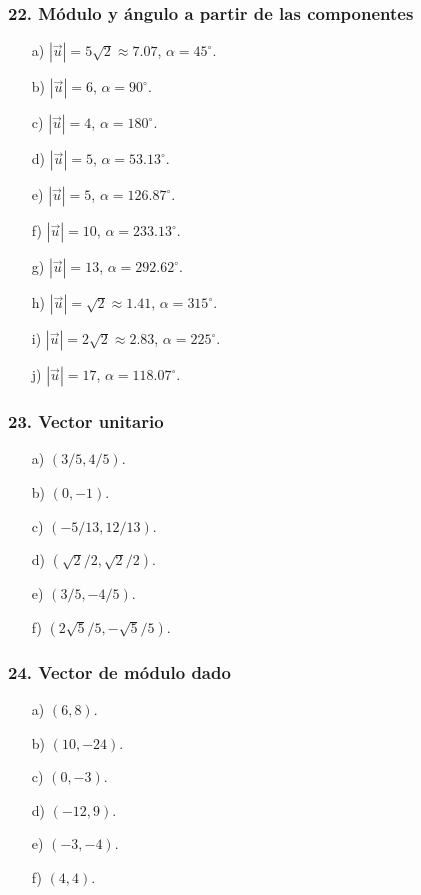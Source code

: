 \subsubsection*{22. Módulo y ángulo a partir de las componentes}
\begin{enumerate}
    \item[a)] $|\vec{u}|=5\sqrt{2}\approx7.07$, $\alpha=45^\circ$.
    \item[b)] $|\vec{u}|=6$, $\alpha=90^\circ$.
    \item[c)] $|\vec{u}|=4$, $\alpha=180^\circ$.
    \item[d)] $|\vec{u}|=5$, $\alpha=53.13^\circ$.
    \item[e)] $|\vec{u}|=5$, $\alpha=126.87^\circ$.
    \item[f)] $|\vec{u}|=10$, $\alpha=233.13^\circ$.
    \item[g)] $|\vec{u}|=13$, $\alpha=292.62^\circ$.
    \item[h)] $|\vec{u}|=\sqrt{2}\approx1.41$, $\alpha=315^\circ$.
    \item[i)] $|\vec{u}|=2\sqrt{2}\approx2.83$, $\alpha=225^\circ$.
    \item[j)] $|\vec{u}|=17$, $\alpha=118.07^\circ$.
\end{enumerate}

\subsubsection*{23. Vector unitario}
\begin{enumerate}
    \item[a)] $(3/5,4/5)$.
    \item[b)] $(0,-1)$.
    \item[c)] $(-5/13,12/13)$.
    \item[d)] $(\sqrt{2}/2,\sqrt{2}/2)$.
    \item[e)] $(3/5,-4/5)$.
    \item[f)] $(2\sqrt{5}/5,-\sqrt{5}/5)$.
\end{enumerate}

\subsubsection*{24. Vector de módulo dado}
\begin{enumerate}
    \item[a)] $(6,8)$.
    \item[b)] $(10,-24)$.
    \item[c)] $(0,-3)$.
    \item[d)] $(-12,9)$.
    \item[e)] $(-3,-4)$.
    \item[f)] $(4,4)$.
\end{enumerate}

